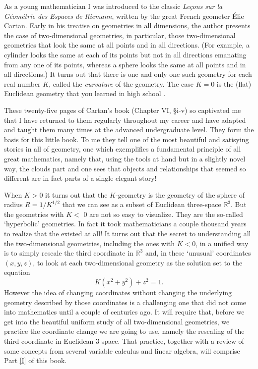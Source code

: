 
As a young mathematician I was introduced to the classic \textit{Le\c{c}ons
sur la G\'{e}om\'{e}trie des Espaces de Riemann}, written by the great French
geometer \'{E}lie Cartan. Early in his treatise on geometries in all
dimensions, the author presents the case of two-dimensional geometries, in
particular, those two-dimensional geometries that look the same at all points
and in all directions. (For example, a cylinder looks the same at each of its
points but not in all directions emanating from any one of its points, whereas
a sphere looks the same at all points and in all directions.) It turns out
that there is one and only one such geometry for each real number $K$, called
the \textit{curvature} of the geometry. The case $K=0$ is the (flat) Euclidean
geometry that you learned in high school .

These twenty-five pages of Cartan's book (Chapter VI, \S i-v) so captivated me
that I have returned to them regularly throughout my career and have adapted
and taught them many times at the advanced undergraduate level. They form the
basis for this little book. To me they tell one of the most beautiful and
satisying stories in all of geometry, one which exemplifies a fundamental
principle of all great mathematics, namely that, using the tools at hand but
in a slightly novel way, the clouds part and one sees that objects and
relationships that seemed so different are in fact parts of a single elegant story!

When $K>0$ it turns out that the $K$-geometry is the geometry of the sphere of
radius $R=1/K^{1/2}$ that we can see as a subset of Euclidean three-space
$\mathbb{R}^{3}$. But the geometries with $K<$ $0$ are not so easy to
visualize. They are the so-called `hyperbolic' geometries. In fact it took
mathematicians a couple thousand years to realize that the existed at all! It
turns out that the secret to understanding all the two-dimensional geometries,
including the ones with $K<0$, in a unified way is to simply rescale the third
coordinate in $\mathbb{R}^{3}$ and, in these `unusual' coordinates $\left(
x,y,z\right)  $, to look at each two-dimensional geometry as the solution set
to the equation%
\[
K\left(  x^{2}+y^{2}\right)  +z^{2}=1.
\]
However the idea of changing coordinates without changing the underlying
geometry described by those coordinates is a challenging one that did not come
into mathematics until a couple of centuries ago. It will require that, before
we get into the beautiful uniform study of all two-dimensional geometries, we
practice the coordinate change we are going to use, namely the rescaling of
the third coordinate in Euclidean $3$-space. That practice, together with a
review of some concepts from several variable calculus and linear algebra,
will comprise Part \ref{I} of this book.

